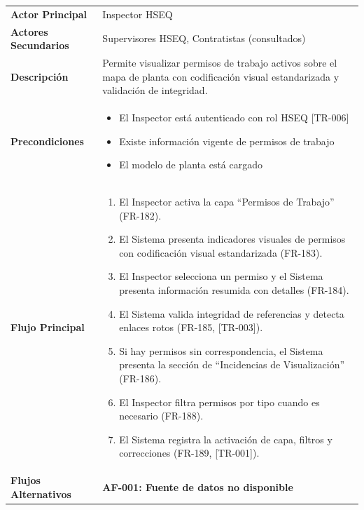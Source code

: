 \begin{longtable}{>{\raggedright\arraybackslash}p{0.21\textwidth} >{\raggedright\arraybackslash}p{0.74\textwidth}} \toprule
\textbf{Actor Principal} & Inspector HSEQ \\
\textbf{Actores Secundarios} & Supervisores HSEQ, Contratistas (consultados) \\
\textbf{Descripción} & Permite visualizar permisos de trabajo activos sobre el mapa de planta con codificación visual estandarizada y validación de integridad. \\
\textbf{Precondiciones} & \parbox[t]{\linewidth}{\vspace{2pt} \begin{itemize}[leftmargin=1.5em, nosep, topsep=0pt]
\item El Inspector está autenticado con rol HSEQ [TR-006]
\item Existe información vigente de permisos de trabajo
\item El modelo de planta está cargado
\end{itemize} \vspace{2pt}} \\
\textbf{Flujo Principal} & \parbox[t]{\linewidth}{\vspace{2pt} \begin{enumerate}[leftmargin=1.5em, nosep, topsep=0pt]
\item El Inspector activa la capa ``Permisos de Trabajo'' (FR-182).
\item El Sistema presenta indicadores visuales de permisos con codificación visual estandarizada (FR-183).
\item El Inspector selecciona un permiso y el Sistema presenta información resumida con detalles (FR-184).
\item El Sistema valida integridad de referencias y detecta enlaces rotos (FR-185, [TR-003]).
\item Si hay permisos sin correspondencia, el Sistema presenta la sección de ``Incidencias de Visualización'' (FR-186).
\item El Inspector filtra permisos por tipo cuando es necesario (FR-188).
\item El Sistema registra la activación de capa, filtros y correcciones (FR-189, [TR-001]).
\end{enumerate} \vspace{2pt}} \\
\textbf{Flujos Alternativos} & \parbox[t]{\linewidth}{\vspace{2pt} \vspace{4pt}\noindent\textbf{AF-001: Fuente de datos no disponible}
}
\end{longtable}
